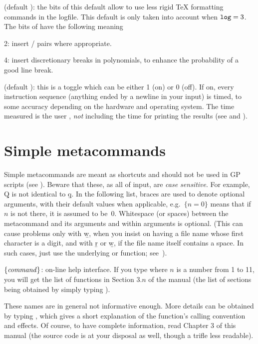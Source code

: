  (default ): the bits of this default allow
 to use less rigid TeX formatting commands in the logfile. This
default is only taken into account when ${\tt log} = 3$. The bits of
 have the following meaning

2: insert  /  pairs where appropriate.

4: insert discretionary breaks in polynomials, to enhance the probability of
a good line break.

 (default ): this is a toggle which can be either 1
(on) or 0 (off). If on, every instruction sequence (anything ended by a
newline in your input) is timed, to some accuracy depending on the hardware
and operating system. The time measured is the user ,
\emph{not} including the time for printing the results (see \kbd{\#} and
\kbd{\#\#}).

\section{Simple metacommands}\label{se:meta}

\noindent
Simple metacommands are meant as shortcuts and should not be used in GP
scripts (see ). Beware that these, as all of  input,
are \emph{case sensitive}. For example, \b{Q} is not identical to \b{q}. In
the following list, braces are used to denote optional arguments, with their
default values when applicable, e.g.~$\{n=0\}$ means that if $n$ is not
there, it is assumed to be~$0$. Whitespace (or spaces) between the
metacommand and its arguments and within arguments is optional. (This can
cause problems only with \b{w}, when you insist on having a file name whose
first character is a digit, and with \b{r} or \b{w}, if the file name itself
contains a space. In such cases, just use the underlying  or
 function; see~).

 $\{\hbox{\it command\/}\}$:  on-line help interface.
If you type  where $n$ is a number from 1 to 11, you will get the
list of functions in Section $3.n$ of the manual (the list of sections being
obtained by simply typing ). \label{se:exthelp}

These names are in general not informative enough. More details can be
obtained by typing , which gives a short explanation of
the function's calling convention and effects. Of course, to have complete
information, read Chapter 3 of this manual (the source code is at your
disposal as well, though a trifle less readable).

